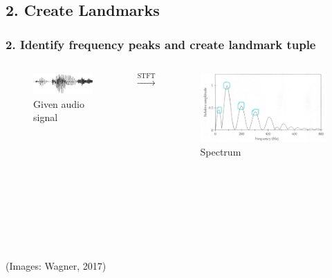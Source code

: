 \documentclass{beamer}
\begin{document}
\subsection{2. Create Landmarks}
\begin{frame}
\frametitle{2. Identify frequency peaks and create landmark tuple}
\begin{columns}
\begin{figure}
\includegraphics[scale=0.25]{pngs/03_oszillo.png} 
\caption{Given audio signal}
\end{figure}
$\xrightarrow[]{\text{STFT}}$
\begin{figure}
\includegraphics[scale=0.1]{pngs/05_spektrum.png} 
\caption{Spectrum}
\end{figure}
\end{columns}
\ \\
\ \\
\ \\
\ \\
\ \\
\ \\
(Images: Wagner, 2017)
\end{frame}
\end{document}
